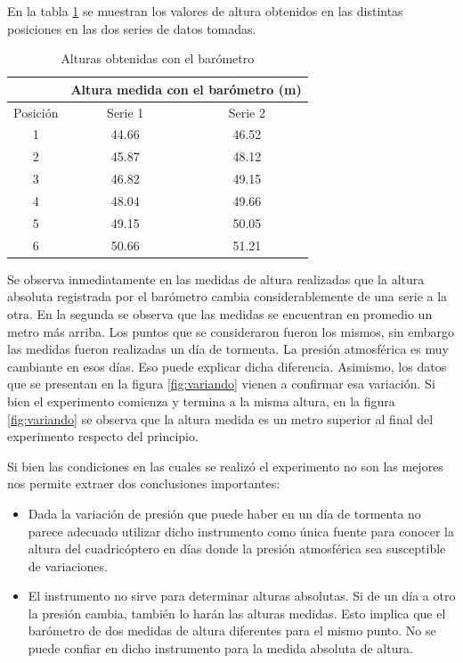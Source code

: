 \documentclass[spanish,12pt,a4paper,titlepage]{report}
\begin{document}
En la tabla \ref{tab:alturasm} se muestran los valores de altura obtenidos en las distintas posiciones en las dos series de datos tomadas.

\begin{table}[H]
\centering
\begin{tabular}{c|c|c|} 

	  
	& \multicolumn{2}{|p{200pt}|}{\cellcolor[gray]{0.8} Altura medida con el barómetro (m)}      \\ \hline
\cellcolor[gray]{0.8} {Posición} & \cellcolor[gray]{0.8} {Serie 1} &\cellcolor[gray]{0.8} {Serie 2}\\ \hline

1 & 44.66 & 46.52 \\ \hline
2 & 45.87 & 48.12\\ \hline
3 & 46.82 & 49.15\\ \hline
4 & 48.04 & 49.66\\ \hline
5 & 49.15 & 50.05\\ \hline
6 & 50.66 & 51.21 \\ \hline
\end{tabular}
\caption{Alturas obtenidas con el barómetro}
\label{tab:alturasm}
\end{table}

Se observa inmediatamente en las medidas de altura realizadas que la altura absoluta registrada por el barómetro cambia considerablemente de una serie a la otra. En la segunda se observa que las medidas se encuentran en promedio un metro más arriba. Los puntos que se consideraron fueron los mismos, sin embargo las medidas fueron realizadas un día de tormenta. La presión atmosférica es muy cambiante en esos días. Eso puede explicar dicha diferencia. Asimismo, los datos que se presentan en la figura \ref{fig:variando} vienen a confirmar esa variación. Si bien el experimento comienza y termina a la misma altura, en la figura \ref{fig:variando} se observa que la altura medida es un metro superior al final del experimento respecto del principio.

Si bien las condiciones en las cuales se realizó el experimento no son las mejores nos permite extraer dos conclusiones importantes:

\begin{itemize}
\item Dada la variación de presión que puede haber en un día de tormenta no parece adecuado utilizar dicho instrumento como única fuente para conocer la altura del cuadricóptero en días donde la presión atmosférica sea susceptible de variaciones. 

\item El instrumento no sirve para determinar alturas absolutas. Si de un día a otro la presión cambia, también lo harán las alturas medidas. Esto implica que el barómetro de dos medidas de altura diferentes para el mismo punto. No se puede confiar en dicho instrumento para la medida absoluta de altura. 

\end{itemize}
\end{document}
